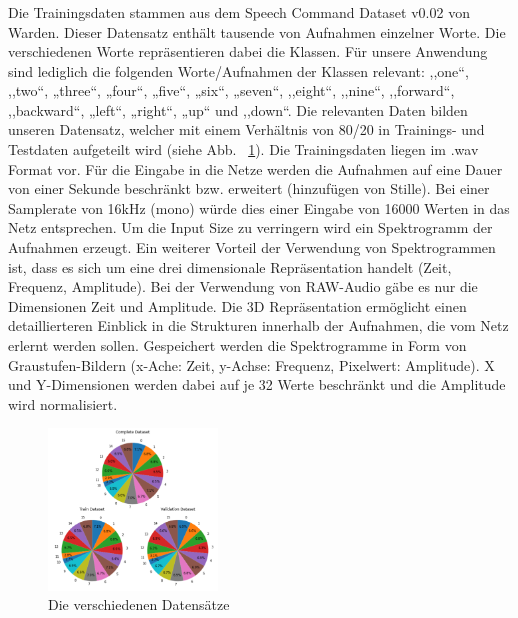 \documentclass[sigconf]{acmart}
\begin{document}
\subsubsection{}
Die Trainingsdaten stammen aus dem Speech Command Dataset v0.02 von Warden\cite{speechcommandsv2}. Dieser Datensatz enthält tausende von Aufnahmen einzelner Worte. Die verschiedenen Worte repräsentieren dabei die Klassen. Für unsere Anwendung sind lediglich die folgenden Worte/Aufnahmen der Klassen relevant: 
\newline
\newline
,,one“, ,,two“, „three“, „four“, „five“, „six“, „seven“, ,,eight“, ,,nine“, ,,forward“, ,,backward“, „left“, „right“, „up“ und ,,down“. 
\newline
\newline
Die relevanten Daten bilden unseren Datensatz, welcher mit einem Verhältnis von 80/20 in Trainings- und Testdaten aufgeteilt wird (siehe Abb. ~\ref{fig:TrainingsDaten}).
\newline
\newline
Die Trainingsdaten liegen im .wav Format vor. Für die Eingabe in die Netze werden die Aufnahmen auf eine Dauer von einer Sekunde beschränkt bzw. erweitert (hinzufügen von Stille). Bei einer Samplerate von 16kHz (mono) würde dies einer Eingabe von 16000 Werten in das Netz entsprechen. Um die Input Size zu verringern wird ein Spektrogramm der Aufnahmen erzeugt.  
Ein weiterer Vorteil der Verwendung von Spektrogrammen ist, dass es sich um eine drei dimensionale Repräsentation handelt (Zeit, Frequenz, Amplitude). Bei der Verwendung von RAW-Audio gäbe es nur die Dimensionen Zeit und Amplitude. Die 3D Repräsentation ermöglicht einen detaillierteren Einblick in die Strukturen innerhalb der Aufnahmen, die vom Netz erlernt werden sollen. Gespeichert werden die Spektrogramme in Form von Graustufen-Bildern (x-Ache: Zeit, y-Achse: Frequenz, Pixelwert: Amplitude). X und Y-Dimensionen werden dabei auf je 32 Werte beschränkt und die Amplitude wird normalisiert. 
\begin{figure}[ht]
  \includegraphics[width=0.4\textwidth]{images/DataBalance}
  \caption{Die verschiedenen Datensätze}
  \Description{}
  \label{fig:TrainingsDaten}
\end{figure}
\end{document}
